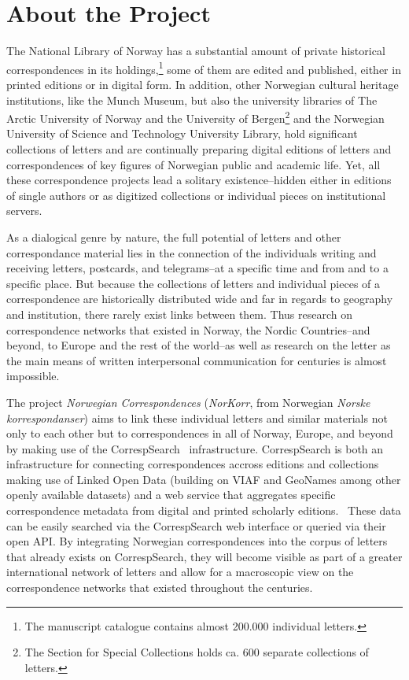 \documentclass[runningheads]{llncs}
\begin{document}
\section{About the Project}
The National Library of Norway has a substantial amount of private
historical correspondences in its
holdings,\footnote{The manuscript catalogue contains almost 200.000 individual letters.} some of them are edited and published, either in printed editions or in digital form. In
addition, other Norwegian cultural heritage institutions, like the Munch
Museum, but also the university
libraries of The Arctic University of
Norway and the University of
Bergen\footnote{The Section for Special Collections holds
ca. 600 separate collections of letters.} and the Norwegian University of Science and
Technology University Library, hold significant
collections of letters and are continually preparing digital editions of letters and
correspondences of key figures of Norwegian public and academic life.
Yet, all these correspondence projects lead a solitary existence--hidden
either in editions of single authors or as digitized collections or
individual pieces on institutional servers.

As a dialogical genre by nature, the full potential of letters and other correspondance material lies in the connection of the individuals writing and receiving letters, postcards, and telegrams--at a specific time and from and to a specific place. But because the collections of letters and individual pieces of a correspondence are historically
distributed wide and far in regards to geography and institution, there rarely exist links between them. Thus research on correspondence
networks that existed in Norway, the Nordic Countries--and beyond, to Europe and the rest of the world--as well as research on the letter as the main means of written interpersonal communication for centuries is almost
impossible.

The project \textit{Norwegian Correspondences} (\textit{NorKorr}, from Norwegian \textit{Norske korrespondanser}) aims to link these individual letters and similar materials not only to each other but to correspondences in
all of Norway, Europe, and beyond by making use of the CorrespSearch~\cite{ref_url9}
infrastructure. CorrespSearch is both an infrastructure for connecting correspondences accross editions and collections making use of Linked Open Data (building on VIAF and GeoNames among other openly available datasets) and a web service that aggregates specific correspondence
metadata from digital and printed scholarly
editions.~\cite{ref_article} These data can be easily
searched via the CorrespSearch web interface or queried via their open API. By integrating Norwegian correspondences into the corpus of letters that already exists on CorrespSearch, they will become visible as part of a greater international network of letters and allow for a
macroscopic view on the correspondence networks that existed throughout the centuries.
\end{document}
